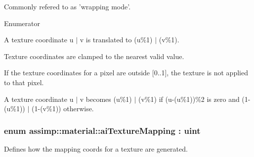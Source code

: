 Commonly refered to as 'wrapping mode'. \begin{Desc}
\item[Enumerator]\par
\begin{description}
\item[{\em 
\hypertarget{namespaceassimp_1_1material_a0d8dbb0d9e989bf10557feef7350c42bac03e8aac23595136b2e8ae6c0216a2a8}{Wrap}\label{namespaceassimp_1_1material_a0d8dbb0d9e989bf10557feef7350c42bac03e8aac23595136b2e8ae6c0216a2a8}
}]A texture coordinate {\ttfamily u $\vert$ v} is translated to {\ttfamily (u\%1) $\vert$ (v\%1)}. \item[{\em 
\hypertarget{namespaceassimp_1_1material_a0d8dbb0d9e989bf10557feef7350c42bab79de0edb6004c453286fe5559d90059}{Clamp}\label{namespaceassimp_1_1material_a0d8dbb0d9e989bf10557feef7350c42bab79de0edb6004c453286fe5559d90059}
}]Texture coordinates are clamped to the nearest valid value. \item[{\em 
\hypertarget{namespaceassimp_1_1material_a0d8dbb0d9e989bf10557feef7350c42ba5429563ef7144fbb6122b68f4f3b91ce}{Decal}\label{namespaceassimp_1_1material_a0d8dbb0d9e989bf10557feef7350c42ba5429563ef7144fbb6122b68f4f3b91ce}
}]If the texture coordinates for a pixel are outside {\ttfamily \mbox{[}0..1\mbox{]}}, the texture is not applied to that pixel. \item[{\em 
\hypertarget{namespaceassimp_1_1material_a0d8dbb0d9e989bf10557feef7350c42baf71c152c20e0719f55db3933401bc499}{Mirror}\label{namespaceassimp_1_1material_a0d8dbb0d9e989bf10557feef7350c42baf71c152c20e0719f55db3933401bc499}
}]A texture coordinate {\ttfamily u $\vert$ v} becomes {\ttfamily (u\%1) $\vert$ (v\%1)} if {\ttfamily (u-\/(u\%1))\%2} is zero and {\ttfamily (1-\/(u\%1)) $\vert$ (1-\/(v\%1))} otherwise. \end{description}
\end{Desc}
\hypertarget{namespaceassimp_1_1material_ae0a6af9b6411ae81bf4227ab6b36f679}{
\subsubsection[{ai\+Texture\+Mapping}]{\setlength{\rightskip}{0pt plus 5cm}enum {\bf assimp\+::material\+::ai\+Texture\+Mapping} \+: uint}}\label{namespaceassimp_1_1material_ae0a6af9b6411ae81bf4227ab6b36f679}
Defines how the mapping coords for a texture are generated.

